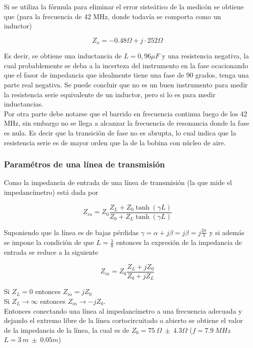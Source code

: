 \documentclass[a4paper,10pt]{article}
\begin{document}
		\indent Si se utiliza la f\'ormula para eliminar el error siste\'atico 
		de la medic\'on se obtiene que (para la frecuencia de 42 MHz, donde 
		todav\'ia se comporta como un inductor)
		
		$$Z_x=-0.48\Omega+j\cdot 252\Omega$$
		
		\indent Es decir, se obtiene una inductancia de $L=0,96 \mu F$ y una 
		resistencia negativa, la cual probablemente se deba a la incerteza del 
		instrumento en la fase ocacionando que el fasor de impedancia que 
		idealmente tiene una fase de 90 grados, tenga una parte real negativa. 
		Se puede concluir que no es un buen instrumento para medir la 
		resistencia serie equivalente de un inductor, pero si lo es para medir 
		inductancias. \\
		\indent Por otra parte debe notarse que el barrido en frecuencia 
		continua luego de los 42 MHz, sin embargo no se llega a alcanzar la 
		frecuencia de resonancia donde la fase es nula. Es decir que la 
		transici\'on de fase no es abrupta, lo cual indica que la resistencia 
		serie es de mayor orden que la de la bobina con n\'ucleo de aire. 

		\subsubsection{Param\'etros de una l\'inea de transmisi\'on}
		
		\indent Como la impedancia de entrada de una l\'inea de transmisi\'on 
		(la que mide el impedanc\'imetro) est\'a dada por 
		
		$$Z_{in}=Z_0\frac{Z_L+Z_0\tanh(\gamma L)}{Z_0+Z_L\tanh(\gamma L)}$$
		
		\indent Suponiendo que la l\'inea es de bajas p\'erdidas 
		$\gamma=\alpha+j\beta=j\beta=j\frac{2\pi}{\lambda}$ y si adem\'as se 
		impone la condici\'on de que $L=\frac{\lambda}{8}$ entonces la 
		expresi\'on de la impedancia de entrada se reduce a la siguiente
		
		$$Z_{in}=Z_0\frac{Z_L+jZ_0}{Z_0+jZ_L}$$
		
		\indent Si $Z_L= 0$ entonces $Z_{in}=jZ_0$ \\
		\indent Si $Z_L \rightarrow \infty$ entonces $Z_{in}\rightarrow-jZ_0$.\\
		\indent Entonces conectando una l\'inea al impedanc\'imetro a una 
		frecuencia adecuada y dejando el extremo libre de la l\'inea 
		cortocircuitado o abierto se obtiene el valor de la impedancia de la 
		l\'inea, la cual es de 
		$Z_0=75~\Omega~\pm~4.3\Omega$ ($f=7.9~MHz$ $L=3~m~\pm~0.05m$) \\
		
\end{document}
